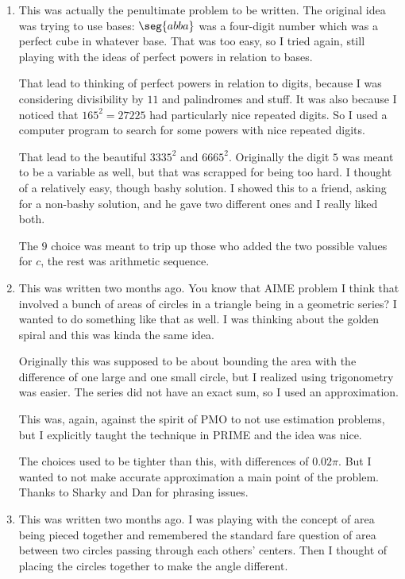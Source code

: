 \documentclass[10pt,paper=letter]{scrartcl}
\begin{document}
\begin{enumerate}
  \item This was actually the penultimate problem to be written. The original idea was trying to use bases: $\seg{abba}$ was a four-digit number which was a perfect cube in whatever base. That was too easy, so I tried again, still playing with the ideas of perfect powers in relation to bases.

  That lead to thinking of perfect powers in relation to digits, because I was considering divisibility by $11$ and palindromes and stuff. It was also because I noticed that $165^2 = 27225$ had particularly nice repeated digits. So I used a computer program to search for some powers with nice repeated digits.

  That lead to the beautiful $3335^2$ and $6665^2$. Originally the digit $5$ was meant to be a variable as well, but that was scrapped for being too hard. I thought of a relatively easy, though bashy solution. I showed this to a friend, asking for a non-bashy solution, and he gave two different ones and I really liked both.

  The $9$ choice was meant to trip up those who added the two possible values for $c$, the rest was arithmetic sequence.

  \item This was written two months ago. You know that AIME problem I think that involved a bunch of areas of circles in a triangle being in a geometric series? I wanted to do something like that as well. I was thinking about the golden spiral and this was kinda the same idea.

  Originally this was supposed to be about bounding the area with the difference of one large and one small circle, but I realized using trigonometry was easier. The series did not have an exact sum, so I used an approximation.

  This was, again, against the spirit of PMO to not use estimation problems, but I explicitly taught the technique in PRIME and the idea was nice.

  The choices used to be tighter than this, with differences of $0.02\pi$. But I wanted to not make accurate approximation a main point of the problem. Thanks to Sharky and Dan for phrasing issues.

  \item This was written two months ago. I was playing with the concept of area being pieced together and remembered the standard fare question of area between two circles passing through each others' centers. Then I thought of placing the circles together to make the angle different.


\end{enumerate}
\end{document}
